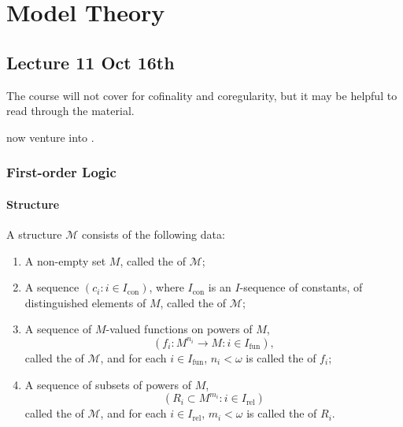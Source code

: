 \documentclass[notoc,notitlepage]{tufte-book}
\DeclareMathOperator{\con}{con}
\DeclareMathOperator{\fun}{fun}
\DeclareMathOperator{\rel}{rel}
\begin{document}



\part{Model Theory}

\chapter{Lecture 11 Oct 16th}%
\label{chp:lecture_11_oct_16th}

The course will not cover for cofinality and coregularity, but it may be helpful to read through the material.

 now venture into .

\section{First-order Logic}%
\label{sec:first_order_logic}

\subsection{Structure}%
\label{sub:structure}

\begin{defn}[Structure]\label{defn:structure}
  A structure $\mathcal{M}$ consists of the following data:
  \begin{enumerate}
    \item A non-empty set $M$, called the  of $\mathcal{M}$;
    \item A sequence $(c_i: i \in I_{\con})$, where $I_{\con}$ is an $I$-sequence of constants, of distinguished elements of $M$, called the  of $\mathcal{M}$;
    \item A sequence of $M$-valued functions on powers of $M$,
      \begin{equation*}
        ( f_i : M^{n_i} \to M : i \in I_{\fun} ),
      \end{equation*}
      called the  of $\mathcal{M}$, and for each $i \in I_{\fun}$, $n_i < \omega$ is called the  of $f_i$;
    \item A sequence of subsets of powers of $M$,
      \begin{equation*}
        ( R_i \subset M^{m_i} : i \in I_{\rel} )
      \end{equation*}
      called the  of $\mathcal{M}$, and for each $i \in I_{\rel}$, $m_i < \omega$ is called the  of $R_i$.
  \end{enumerate}
\end{defn}
\end{document}
